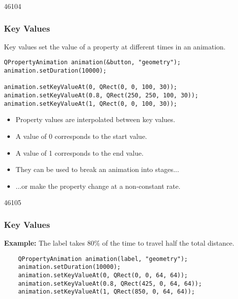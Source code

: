 \begin{slide}[fragile]{46104}\frametitle{Key Values}
Key values set the value of a property at different times in an animation.
\small
\begin{lstlisting}
QPropertyAnimation animation(&button, "geometry");
animation.setDuration(10000);

animation.setKeyValueAt(0, QRect(0, 0, 100, 30));
animation.setKeyValueAt(0.8, QRect(250, 250, 100, 30));
animation.setKeyValueAt(1, QRect(0, 0, 100, 30));
\end{lstlisting}
\normalsize
\begin{itemize}
\item Property values are interpolated between key values.
\item A value of 0 corresponds to the start value.
\item A value of 1 corresponds to the end value.
\item They can be used to break an animation into stages...
\item ...or make the property change at a non-constant rate.
\end{itemize}

\end{slide}

\begin{slide}[fragile]{46105}\frametitle{Key Values}
\textbf{Example:} The label takes 80\% of the time to travel half the total
distance.

\vspace*{1.5em}

\small
\begin{lstlisting}
    QPropertyAnimation animation(label, "geometry");
    animation.setDuration(10000);
    animation.setKeyValueAt(0, QRect(0, 0, 64, 64));
    animation.setKeyValueAt(0.8, QRect(425, 0, 64, 64));
    animation.setKeyValueAt(1, QRect(850, 0, 64, 64));
\end{lstlisting}
\normalsize
{}
\end{slide}

\label{Animation-Easing-Curves}


